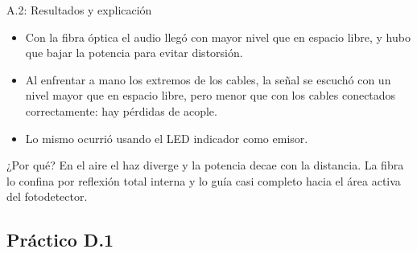 \documentclass[aspectratio=169,10pt]{beamer}
\begin{document}
\begin{frame}{A.2: Resultados y explicación}
  \begin{itemize}
    \item Con la fibra óptica el audio llegó con {mayor nivel} que en espacio libre, y hubo que bajar la potencia para evitar distorsión.
    \item Al enfrentar a mano los extremos de los cables, la señal se escuchó con un nivel mayor que en espacio libre, pero {menor} que con los cables conectados correctamente: hay pérdidas de acople.
    \item Lo mismo ocurrió usando el LED indicador como emisor.
  \end{itemize}

  \medskip
  \begin{block}{¿Por qué?}
    En el aire el haz {diverge} y la potencia decae con la distancia. La fibra lo {confina} por reflexión total interna y lo guía casi completo hacia el área activa del fotodetector.
  \end{block}
\end{frame}

\subsection{Práctico D.1}
\end{document}
